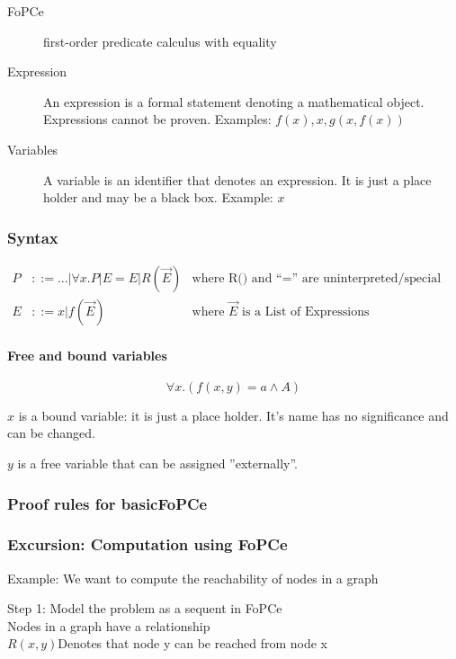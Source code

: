 \begin{description}
	\item[FoPCe] first-order predicate calculus with equality
	\item[Expression] An expression is a formal statement denoting a mathematical object. Expressions cannot be proven. Examples: $f(x), x, g(x, f(x))$
	\item[Variables] A variable is an identifier that denotes an expression. It is just a place holder and may be a black box. Example: $x$
\end{description}

\subsubsection{Syntax}
\begin{align*}
	P &::= ...| \forall x.P | E = E | R(\vec{E}) 
	& \text{where R() and “=” are uninterpreted/special relationship symbols}\\
	E &::= x | f(\vec{E})
	& \text{where $\vec{E}$ is a List of Expressions}
\end{align*}	

\paragraph{Free and bound variables} \[
	\forall x .(f(x,y) = a \land A)
\]

$x$ is a bound variable: it is just a place holder. It's name has no significance and can be changed.

$y$ is a free variable that can be assigned ''externally''.

\subsubsection{Proof rules for basicFoPCe}


\subsubsection{Excursion: Computation using FoPCe}
Example: We want to compute the reachability of nodes in a graph %

Step 1: Model the problem as a sequent in FoPCe \\

Nodes in a graph have a relationship \\
$R(x,y)$\qquad Denotes that node y can be reached from node x\\

